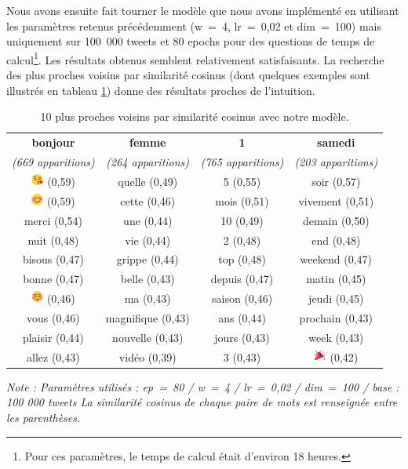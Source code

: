 \documentclass[11pt,french,french]{article}
\let\rmarkdownfootnote\footnote%
\def\footnote{\protect\rmarkdownfootnote}
\begin{document}
Nous avons ensuite fait tourner le modèle que nous avons implémenté en
utilisant les paramètres retenus précédemment (w~=~4, lr~=~0,02 et
dim~=~100) mais uniquement sur 100~000 tweets et 80 epochs pour des
questions de temps de calcul\footnote{Pour ces paramètres, le temps de
  calcul était d'environ 18 heures.}. Les résultats obtenus semblent
relativement satisfaisants. La recherche des plus proches voisins par
similarité cosinus (dont quelques exemples sont illustrés en tableau
\ref{table:knn_ark}) donne des résultats proches de l'intuition.

\begin{table}[!h]
\begin{center}
\begin{tabular}{|c|c|c|c|}
    \hline
\textbf{bonjour} & \textbf{femme} & \textbf{1} & \textbf{samedi} \tabularnewline
\emph{(669 apparitions)} & \emph{(264 apparitions)} & \emph{(765 apparitions)} & \emph{(203 apparitions)} \tabularnewline
       \hline
\includegraphics[height=4mm]{img/emojis/1.png} (0,59) & quelle (0,49) & 5 (0,55) & soir (0,57) \tabularnewline
\includegraphics[height=4mm]{img/emojis/2.png} (0,59) & cette (0,46) & mois (0,51) & vivement (0,51) \tabularnewline
merci (0,54) & une (0,44) & 10 (0,49) & demain (0,50) \tabularnewline
nuit (0,48) & vie (0,44) & 2 (0,48) & end (0,48) \tabularnewline
bisous (0,47) & grippe (0,44) & top (0,48) & weekend (0,47) \tabularnewline
bonne (0,47) & belle (0,43) & depuis (0,47) & matin (0,45) \tabularnewline
\includegraphics[height=4mm]{img/emojis/3.png} (0,46) & ma (0,43) & saison (0,46) & jeudi (0,45) \tabularnewline
vous (0,46) & magnifique (0,43) & ans (0,44) & prochain (0,43) \tabularnewline
plaisir (0,44) & nouvelle (0,43) & jours (0,43) & week (0,43) \tabularnewline
allez (0,43) & vidéo (0,39) & 3 (0,43) & \includegraphics[height=4mm]{img/emojis/4.png} (0,42) \tabularnewline
    \hline
 \end{tabular}
\captionsetup{margin=0cm,format=hang,justification=justified}
\caption{10 plus proches voisins par similarité cosinus avec \og notre \fg{} modèle.}\label{table:knn_ark}
\end{center}
\vspace{-0.3cm}
\footnotesize
\emph{Note : Paramètres utilisés : ep = 80 / w = 4 / lr = 0,02 / dim = 100 / base : 100 000 tweets\newline
La similarité cosinus de chaque paire de mots est renseignée entre les parenthèses.}

\end{table}
\end{document}
